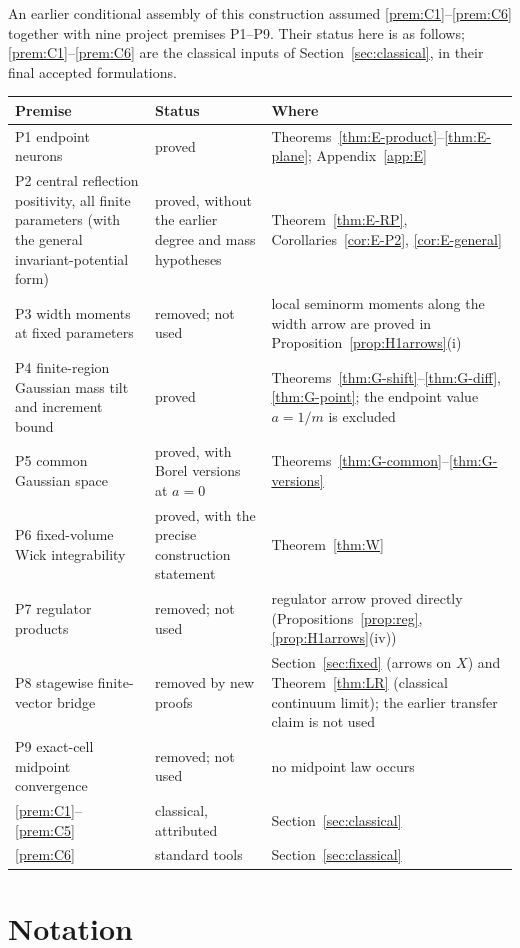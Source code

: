 \documentclass[11pt]{article}
\theoremstyle{plain}
\theoremstyle{definition}
\theoremstyle{remark}
\begin{document}
An earlier conditional assembly of this construction assumed
\ref{prem:C1}--\ref{prem:C6} together with nine project premises P1--P9. Their status
here is as follows; \ref{prem:C1}--\ref{prem:C6} are the classical inputs of
Section~\ref{sec:classical}, in their final accepted formulations.
{\small
\begin{longtable}{@{}p{}p{}p{}@{}}
\toprule
Premise & Status & Where\\
\midrule
P1 endpoint neurons & proved & Theorems~\ref{thm:E-product}--\ref{thm:E-plane}; Appendix~\ref{app:E}\\
P2 central reflection positivity, all finite parameters (with the general invariant-potential form) & proved, without the earlier degree and mass hypotheses & Theorem~\ref{thm:E-RP}, Corollaries~\ref{cor:E-P2}, \ref{cor:E-general}\\
P3 width moments at fixed parameters & removed; not used & local seminorm moments along the width arrow are proved in Proposition~\ref{prop:H1arrows}(i)\\
P4 finite-region Gaussian mass tilt and increment bound & proved & Theorems~\ref{thm:G-shift}--\ref{thm:G-diff}, \ref{thm:G-point}; the endpoint value $a=1/m$ is excluded\\
P5 common Gaussian space & proved, with Borel versions at $a=0$ & Theorems~\ref{thm:G-common}--\ref{thm:G-versions}\\
P6 fixed-volume Wick integrability & proved, with the precise construction statement & Theorem~\ref{thm:W}\\
P7 regulator products & removed; not used & regulator arrow proved directly (Propositions~\ref{prop:reg}, \ref{prop:H1arrows}(iv))\\
P8 stagewise finite-vector bridge & removed by new proofs & Section~\ref{sec:fixed} (arrows on $X$) and Theorem~\ref{thm:LR} (classical continuum limit); the earlier transfer claim is not used\\
P9 exact-cell midpoint convergence & removed; not used & no midpoint law occurs\\
\ref{prem:C1}--\ref{prem:C5} & classical, attributed & Section~\ref{sec:classical}\\
\ref{prem:C6} & standard tools & Section~\ref{sec:classical}\\
\bottomrule
\end{longtable}}

\section{Notation}\label{app:notation}
\end{document}
